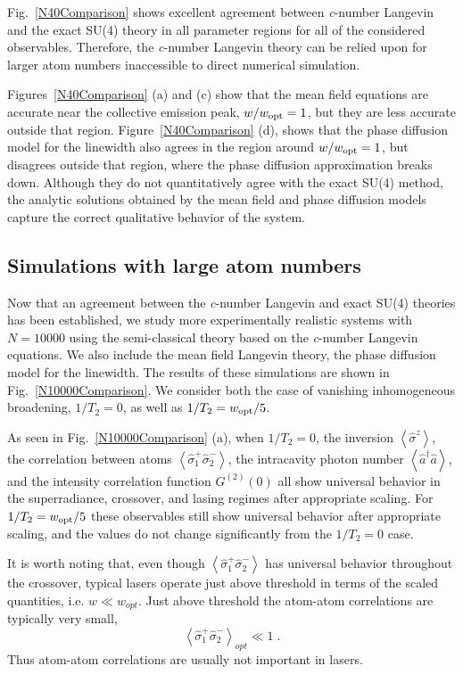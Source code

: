 \documentclass[aps,
twocolumn,
showpacs,
superscriptaddress,groupedaddress]{revtex4}
\begin{document}
Fig.~\ref{N40Comparison} shows excellent agreement between {\it
c}-number Langevin and the exact SU(4) theory in all parameter regions
for all of the considered observables. Therefore, the {\it c}-number
Langevin theory can be relied upon for larger atom numbers inaccessible
to direct numerical simulation.

Figures~\ref{N40Comparison} (a) and (c) show that the mean field
equations are accurate near the collective emission peak, $w/w_{\rm opt}=1$,
but they are less accurate outside that region.
Figure~\ref{N40Comparison} (d), shows that the phase diffusion model for
the linewidth also agrees in the region around $w/w_{\rm opt}=1$, but
disagrees outside that region, where the phase diffusion approximation
breaks down.  Although they do not quantitatively agree with the exact
SU(4) method, the analytic solutions obtained by the mean field and
phase diffusion models capture the correct qualitative behavior of the
system.


\subsection{Simulations with large atom numbers}

Now that an agreement between the {\it c}-number Langevin and exact
SU(4) theories has been established, we study more experimentally
realistic systems with $N=10000$ using the semi-classical theory based
on the {\it c}-number Langevin equations. We also include the mean field
Langevin theory, the phase diffusion model for the linewidth. The
results of these simulations are shown in Fig.~\ref{N10000Comparison}.
We consider both the case of vanishing inhomogeneous broadening,
$1/T_2=0$, as well as $1/T_2=w_{\rm opt}/5$.

As seen in Fig.~\ref{N10000Comparison} (a), when $1/T_2=0$, the
inversion $\left<\hat{\sigma}^{z}\right>$, the correlation between atoms
$\left<\hat{\sigma}_{1}^{+} \hat{\sigma}_{2}^{-}\right>$, the
intracavity photon number  $\left<\hat{a}^{\dagger}\hat{a}\right>$,  and
the intensity correlation function $G^{(2)}(0)$ all show universal
behavior in the superradiance, crossover, and lasing regimes after
appropriate scaling.  For $1/T_2=w_{\rm opt}/5$ these observables still show
universal behavior after appropriate scaling, and the values do not
change significantly from the $1/T_2=0$ case.

It is worth noting that, even though  $\left<\hat{\sigma}_{1}^{+}
\hat{\sigma}_{2}^{-}\right>$ has universal behavior throughout the
crossover, typical lasers operate just above threshold in terms of the
scaled quantities, i.e. $w \ll w_{opt}$.  Just above threshold the
atom-atom correlations are typically very small,
\begin{equation}
\left<\hat{\sigma}_{1}^{+}\hat{\sigma}_{2}^{-}\right>_{opt} \ll 1\;.
\end{equation}
Thus atom-atom correlations are usually not important in lasers.
\end{document}
